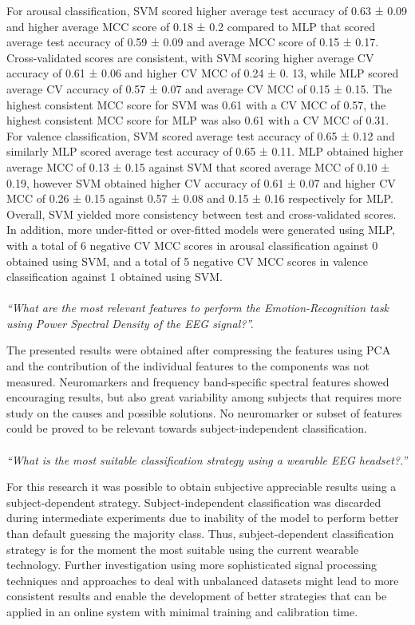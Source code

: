 For arousal classification, \ac{SVM} scored higher average test accuracy of 0.63 ± 0.09 and higher average \ac{MCC} score of 0.18 ± 0.2 compared to \ac{MLP} that scored average test accuracy of 0.59 ± 0.09 and average \ac{MCC} score of 0.15 ± 0.17. Cross-validated scores are consistent, with \ac{SVM} scoring higher average CV accuracy of 0.61 ± 0.06 and higher \ac{CV MCC} of 0.24 ± 0. 13, while \ac{MLP} scored average CV accuracy of 0.57 ± 0.07 and average \ac{CV MCC} of 0.15 ± 0.15. The highest consistent \ac{MCC} score for \ac{SVM} was 0.61 with a \ac{CV MCC} of 0.57, the highest consistent \ac{MCC} score for \ac{MLP} was also 0.61 with a \ac{CV} \ac{MCC} of 0.31. For valence classification, \ac{SVM} scored average test accuracy of 0.65 ± 0.12 and similarly \ac{MLP} scored average test accuracy of 0.65 ± 0.11. \ac{MLP} obtained higher average \ac{MCC} of 0.13 ± 0.15 against \ac{SVM} that scored average \ac{MCC} of 0.10 ± 0.19, however \ac{SVM} obtained higher CV accuracy of 0.61 ± 0.07 and higher \ac{CV} \ac{MCC} of 0.26 ± 0.15 against 0.57 ± 0.08 and 0.15 ± 0.16 respectively for \ac{MLP}. Overall, \ac{SVM} yielded more consistency between test and cross-validated scores. In addition, more under-fitted or over-fitted models were generated using \ac{MLP}, with a total of 6 negative \ac{CV MCC} scores in arousal classification against 0 obtained using \ac{SVM}, and a total of 5 negative \ac{CV MCC} scores in valence classification against 1 obtained using \ac{SVM}.
\\
\\
\emph{“What are the most relevant features to perform the Emotion-Recognition task using Power Spectral Density of the EEG signal?”.}

The presented results were obtained after compressing the features using PCA and the contribution of the individual features to the components was not measured. Neuromarkers and frequency band-specific spectral features showed encouraging results, but also great variability among subjects that requires more study on the causes and possible solutions. No neuromarker or subset of features could be proved to be relevant towards subject-independent classification.
\\
\\
\emph{“What is the most suitable classification strategy using a wearable EEG headset?.”}

For this research it was possible to obtain subjective appreciable results using a subject-dependent strategy. Subject-independent classification was discarded during intermediate experiments due to inability of the model to perform better than default guessing the majority class. Thus, subject-dependent classification strategy is for the moment the most suitable using the current wearable technology. Further investigation using more sophisticated signal processing techniques and approaches to deal with unbalanced datasets might lead to more consistent results and enable the development of better strategies that can be applied in an online system with minimal training and calibration time.



